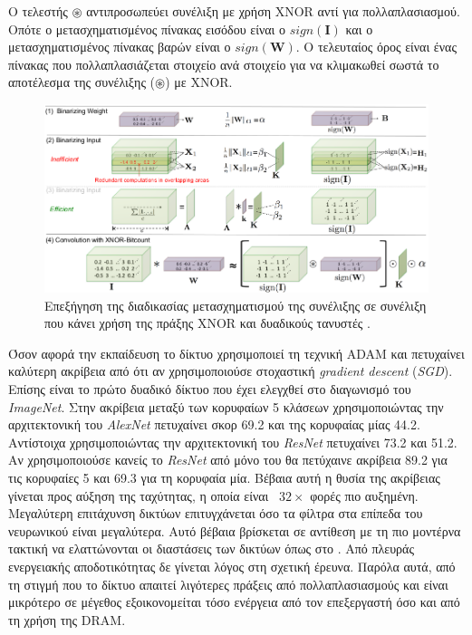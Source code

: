 Ο τελεστής $ \circledast$ αντιπροσωπεύει συνέλιξη με χρήση XNOR αντί για πολλαπλασιασμού.
Οπότε ο μετασχηματισμένος πίνακας εισόδου είναι ο $ sign(\mathbf{I}) $ και ο μετασχηματισμένος πίνακας βαρών είναι ο $ sign(\mathbf{W}) $.
Ο τελευταίος όρος είναι ένας πίνακας που πολλαπλασιάζεται στοιχείο ανά στοιχείο για να κλιμακωθεί σωστά το αποτέλεσμα της συνέλιξης ($  \circledast $) με XNOR.

\begin{figure}
\centering
\includegraphics[width = \textwidth]{figures/XNOR_Net/XNOR_NET_procedure.png}
\caption[Αποτύπωση της συνέλιξης στο XNOR Net]{Επεξήγηση της διαδικασίας μετασχηματισμού της συνέλιξης σε συνέλιξη που κάνει χρήση της πράξης XNOR και δυαδικούς τανυστές \cite{18}.}
\label{fig:XNOR_NET_procedure}
\end{figure}

Όσον αφορά την εκπαίδευση το δίκτυο χρησιμοποιεί τη τεχνική ADAM \cite{19} και πετυχαίνει καλύτερη ακρίβεια από ότι αν χρησιμοποιούσε στοχαστική \textit{gradient descent} (\textit{SGD}). Επίσης είναι το πρώτο δυαδικό δίκτυο που έχει ελεγχθεί στο διαγωνισμό του \textit{ImageNet}. Στην ακρίβεια μεταξύ των κορυφαίων 5 κλάσεων χρησιμοποιώντας την αρχιτεκτονική του \textit{AlexNet} πετυχαίνει σκορ 69.2 και της κορυφαίας μίας 44.2. Αντίστοιχα χρησιμοποιώντας την αρχιτεκτονική του \textit{ResNet} πετυχαίνει 73.2 και 51.2. Αν χρησιμοποιούσε κανείς το \textit{ResNet} από μόνο του θα πετύχαινε ακρίβεια 89.2 για τις κορυφαίες 5 και 69.3 για τη κορυφαία μία. Βέβαια αυτή η θυσία της ακρίβειας γίνεται προς αύξηση της ταχύτητας, η οποία είναι ~$32\times$ φορές πιο αυξημένη. Μεγαλύτερη επιτάχυνση δικτύων επιτυγχάνεται όσο τα φίλτρα στα επίπεδα του νευρωνικού είναι μεγαλύτερα. Αυτό βέβαια βρίσκεται σε αντίθεση με τη πιο μοντέρνα τακτική να ελαττώνονται οι διαστάσεις των δικτύων όπως στο \cite{23}. 
Από πλευράς ενεργειακής αποδοτικότητας δε γίνεται λόγος στη σχετική έρευνα. Παρόλα αυτά, από τη στιγμή που το δίκτυο απαιτεί λιγότερες πράξεις από πολλαπλασιασμούς και είναι μικρότερο σε μέγεθος εξοικονομείται τόσο ενέργεια από τον επεξεργαστή όσο και από τη χρήση της DRAM.


